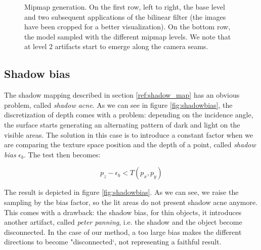\begin{figure}
{  \label{fig:jemip1}
} 
\caption{Mipmap generation. On the first row, left to right, the base level and two subsequent applications of the bilinear filter (the images have been cropped for a better visualization). On the bottom row, the model sampled with the different mipmap levels. We note that at level 2 artifacts start to emerge along the camera seams.}
\label{fig:mipmaps}
\end{figure}


\subsection{Shadow bias}

The shadow mapping described in section \ref{ref:shadow_map} has an obvious problem, called \emph{shadow acne}. As we can see in figure \ref{fig:shadowbias}, the discretization of depth comes with a problem: depending on the incidence angle, the surface starts generating an alternating pattern of dark and light on the visible areas. The solution in this case is to introduce a constant factor when we are comparing the texture space position and the depth of a point, called \emph{shadow bias} $\epsilon_b$. The test then becomes:

$$
p_z - \epsilon_b < T(p_x,p_y)
$$ 

The result is depicted in figure \ref{fig:shadowbias}. As we can see, we raise the sampling by the bias factor, so the lit areas do not present shadow acne anymore. This comes with a drawback: the shadow bias, for thin objects, it introduces another artifact, called \emph{peter panning}, i.e. the shadow and the object become disconnected. In the case of our method, a too large bias makes the different directions to become "disconnected`, not representing a faithful result. 

